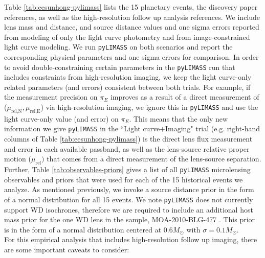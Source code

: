 \documentclass[twocolumn]{aastex631}
\begin{document}
\indent Table \ref{tab:eesunhong-pylimass} lists the 15 planetary events, the discovery paper references, as well as the high-resolution follow up analysis references. We include lens mass and distance, and source distance values and one sigma errors reported from modeling of only the light curve photometry and from image-constrained light curve modeling. We run \texttt{pyLIMASS} on both scenarios and report the corresponding physical parameters and one sigma errors for comparison. In order to avoid double-constraining certain parameters in the \texttt{pyLIMASS} run that includes constraints from high-resolution imaging, we keep the light curve-only related parameters (and errors) consistent between both trials. For example, if the measurement precision on $\pi_E$ improves as a result of a direct measurement of ($\mu_{\textrm{rel,N}}, \mu_{\textrm{rel,E}}$) via high-resolution imaging, we ignore this in \texttt{pyLIMASS} and use the light curve-only value (and error) on $\pi_E$. This means that the only new information we give \texttt{pyLIMASS} in the ``Light curve$+$Imaging" trial (e.g. right-hand columns of Table \ref{tab:eesunhong-pylimass}) is the direct lens flux measurement and error in each available passband, as well as the lens-source relative proper motion ($\mu_{\textrm{rel}})$ that comes from a direct measurement of the lens-source separation. Further, Table \ref{tab:observables-priors} gives a list of all \texttt{pyLIMASS} microlensing observables and priors that were used for each of the 15 historical events we analyze. As mentioned previously, we invoke a source distance prior in the form of a normal distribution for all 15 events. We note \texttt{pyLIMASS} does not currently support WD isochrones, therefore we are required to include an additional host mass prior for the one WD lens in the sample, MOA-2010-BLG-477 \citep{blackman:2021a}. This prior is in the form of a normal distribution centered at 0.6$M_{\odot}$ with $\sigma = 0.1M_{\odot}$. \\
\indent For this empirical analysis that includes high-resolution follow up imaging, there are some important caveats to consider:
\end{document}
